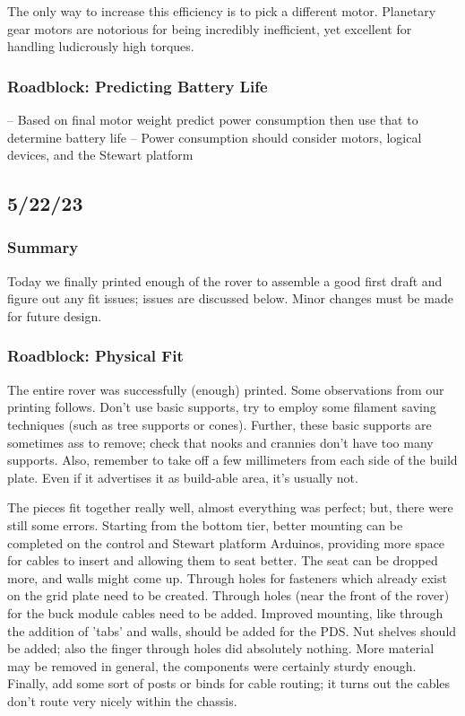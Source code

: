 \documentclass[a4paper, 10pt]{article}
\begin{document}
		The only way to increase this efficiency is to pick a different motor. Planetary gear motors are notorious for being incredibly inefficient, yet excellent for handling ludicrously high torques. 	
		
		\subsubsection{Roadblock: Predicting Battery Life}	
				
		
		-- Based on final motor weight predict power consumption then use that to determine battery life
		-- Power consumption should consider motors, logical devices, and the Stewart platform	
		
	\subsection{5/22/23}
		\subsubsection{Summary}
		Today we finally printed enough of the rover to assemble a good first draft and figure out any fit issues; issues are discussed below. Minor changes must be made for future design. 
		
		\subsubsection{Roadblock: Physical Fit}
		The entire rover was successfully (enough) printed. Some observations from our printing follows. Don't use basic supports, try to employ some filament saving techniques (such as tree supports or cones). Further, these basic supports are sometimes ass to remove; check that nooks and crannies don't have too many supports. Also, remember to take off a few millimeters from each side of the build plate. Even if it advertises it as build-able area, it's usually not.		
		
		The pieces fit together really well, almost everything was perfect; but, there were still some errors. Starting from the bottom tier, better mounting can be completed on the control and Stewart platform Arduinos, providing more space for cables to insert and allowing them to seat better. The seat can be dropped more, and walls might come up. Through holes for fasteners which already exist on the grid plate need to be created. Through holes (near the front of the rover) for the buck module cables need to be added. Improved mounting, like through the addition of 'tabs' and walls, should be added for the PDS. Nut shelves should be added; also the finger through holes did absolutely nothing. More material may be removed in general, the components were certainly sturdy enough. Finally, add some sort of posts or binds for cable routing; it turns out the cables don't route very nicely within the chassis.
		
\end{document}
